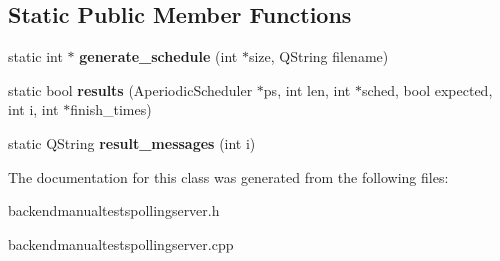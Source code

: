 \subsection*{Static Public Member Functions}
\begin{DoxyCompactItemize}
\item 
\mbox{\label{classBackendManualTestsPollingServer_af4380e1a4fd0bafc6d47093f05d37e59}} 
static int $\ast$ {\bfseries generate\+\_\+schedule} (int $\ast$size, Q\+String filename)
\item 
\mbox{\label{classBackendManualTestsPollingServer_a093c578eacbe839ce1bafc1e907d53f9}} 
static bool {\bfseries results} (Aperiodic\+Scheduler $\ast$ps, int len, int $\ast$sched, bool expected, int i, int $\ast$finish\+\_\+times)
\item 
\mbox{\label{classBackendManualTestsPollingServer_ac4f8b7a094f44fa42428206db0d0bdd5}} 
static Q\+String {\bfseries result\+\_\+messages} (int i)
\end{DoxyCompactItemize}


The documentation for this class was generated from the following files\+:\begin{DoxyCompactItemize}
\item 
backendmanualtestspollingserver.\+h\item 
backendmanualtestspollingserver.\+cpp\end{DoxyCompactItemize}
